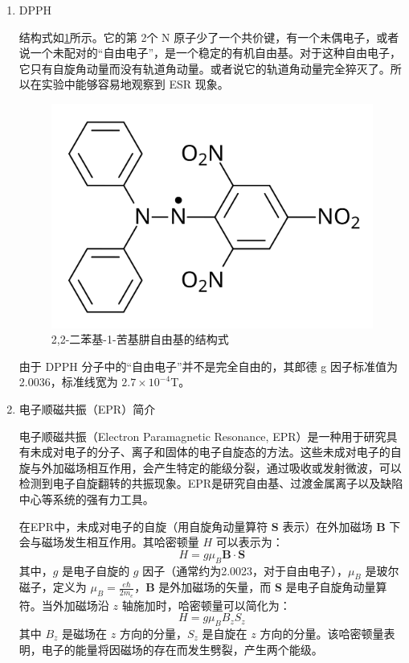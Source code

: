 \documentclass[dvipsnames, svgnames,a4paper,11pt]{article}
\begin{document}









	\begin{enumerate}
		\item DPPH
		
		结构式如\cref{fig:dpph}所示。它的第 2个 N 原子少了一个共价键，有一个未偶电子，或者说一个未配对的“自由电子”，是一个稳定的有机自由基。对于这种自由电子，它只有自旋角动量而没有轨道角动量。或者说它的轨道角动量完全猝灭了。所以在实验中能够容易地观察到 ESR 现象。
		
		\begin{figure}[h!]
			\centering
			\includegraphics[width=0.4\linewidth]{images/DPPH}
			\caption{2,2-二苯基-1-苦基肼自由基的结构式}
			\label{fig:dpph}
		\end{figure}
		
		由于 DPPH 分子中的“自由电子”并不是完全自由的，其郎德 g 因子标准值为 2.0036，标准线宽为 $2.7\times10^{-4}$T。
		
		\item 电子顺磁共振（EPR）简介
		
		电子顺磁共振（Electron Paramagnetic Resonance, EPR）是一种用于研究具有未成对电子的分子、离子和固体的电子自旋态的方法。这些未成对电子的自旋与外加磁场相互作用，会产生特定的能级分裂，通过吸收或发射微波，可以检测到电子自旋翻转的共振现象。EPR是研究自由基、过渡金属离子以及缺陷中心等系统的强有力工具。
		
		在EPR中，未成对电子的自旋（用自旋角动量算符 \( \mathbf{S} \) 表示）在外加磁场 \( \mathbf{B} \) 下会与磁场发生相互作用。其哈密顿量 \( H \) 可以表示为：\[ H = g \mu_B \mathbf{B} \cdot \mathbf{S} \]其中，\( g \) 是电子自旋的 \( g \) 因子（通常约为2.0023，对于自由电子），\( \mu_B \) 是玻尔磁子，定义为 \( \mu_B = \frac{e \hbar}{2m_e} \)，\( \mathbf{B} \) 是外加磁场的矢量，而 \( \mathbf{S} \) 是电子自旋角动量算符。当外加磁场沿 \( z \) 轴施加时，哈密顿量可以简化为：\[ H = g \mu_B B_z S_z \]其中 \( B_z \) 是磁场在 \( z \) 方向的分量，\( S_z \) 是自旋在 \( z \) 方向的分量。该哈密顿量表明，电子的能量将因磁场的存在而发生劈裂，产生两个能级。
		

\end{enumerate}
\end{document}
